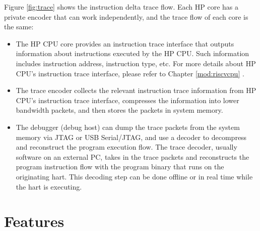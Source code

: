 \documentclass[main\_\_EN.tex]{subfiles}
\begin{document}
Figure \ref{fig:trace} shows the instruction delta trace flow. Each HP core has a private encoder that can work independently, and the trace flow of each core is the same:
\begin{itemize}
    \item The HP CPU core provides an instruction trace interface that outputs information about instructions executed by the HP CPU. Such information includes instruction address, instruction type, etc. For more details about \chipname{} HP CPU's instruction trace interface, please refer to Chapter \ref{mod:riscvcpu} \textit{}.
    \item The trace encoder collects the relevant instruction trace information from HP CPU's instruction trace interface, compresses the information into lower bandwidth packets, and then stores the packets in system memory.
    \item The debugger (debug host) can dump the trace packets from the system memory via JTAG or USB Serial/JTAG, and use a decoder to decompress and reconstruct the program execution flow. The trace decoder, usually software on an external PC, takes in the trace packets and reconstructs the program instruction flow with the program binary that runs on the originating hart. This decoding step can be done offline or in real time while the hart is executing.
\end{itemize}



\section{Features}
\label{sec:riscvtracenc-features}
\end{document}
